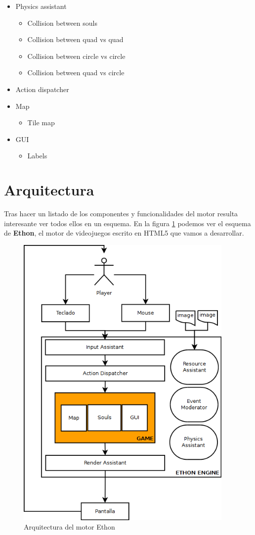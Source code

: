 \documentclass[a4paper]{article}
\begin{document}
\begin{itemize}
  \item Physics assistant
  \begin{itemize}
    \item Collision between souls
    \item Collision between quad vs quad
    \item Collision between circle vs circle
    \item Collision between quad vs circle
  \end{itemize}
  \item Action dispatcher
  \item Map
  \begin{itemize}
    \item Tile map
  \end{itemize}
  \item GUI
  \begin{itemize}
    \item Labels
  \end{itemize}
\end{itemize}

\section{Arquitectura}

Tras hacer un listado de los componentes y funcionalidades del motor resulta interesante ver todos ellos en un esquema. En la figura \ref{architecture} podemos ver el esquema de \textbf{Ethon}, el motor de videojuegos escrito en HTML5 que vamos a desarrollar.

\begin{figure}[h]
  \begin{center}
    \includegraphics[width=400px]{images/architecture.png}
    \caption{Arquitectura del motor Ethon}
    \label{architecture}
  \end{center}
\end{figure}
\end{document}
